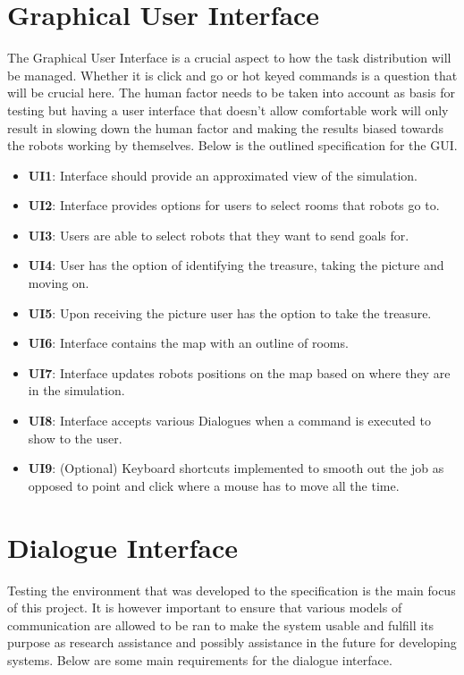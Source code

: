     \section{Graphical User Interface}
      The Graphical User Interface is a crucial aspect to how the task distribution will be managed. Whether it is click and go or hot keyed commands is a question that will be crucial here. The human factor needs to be taken into account as basis for testing but having a user interface that doesn't allow comfortable work will only result in slowing down the human factor and making the results biased towards the robots working by themselves. Below is the outlined specification for the GUI.
      
        \begin{itemize}
          \item \textbf{UI1}: Interface should provide an approximated view of the simulation.
          \item \textbf{UI2}: Interface provides options for users to select rooms that robots go to.
          \item \textbf{UI3}: Users are able to select robots that they want to send goals for.
          \item \textbf{UI4}: User has the option of identifying the treasure, taking the picture and moving on.
          \item \textbf{UI5}: Upon receiving the picture user has the option to take the treasure.
          \item \textbf{UI6}: Interface contains the map with an outline of rooms.
          \item \textbf{UI7}: Interface updates robots positions on the map based on where they are in the simulation.
          \item \textbf{UI8}: Interface accepts various Dialogues when a command is executed to show to the user.
          \item \textbf{UI9}: (Optional) Keyboard shortcuts implemented to smooth out the job as opposed to point and click where a mouse has to move all the time.
        \end{itemize}
    \section{Dialogue Interface}
      Testing the environment that was developed to the specification is the main focus of this project. It is however important to ensure that various models of communication are allowed to be ran to make the system usable and fulfill its purpose as research assistance and possibly assistance in the future for developing systems. Below are some main requirements for the dialogue interface.

